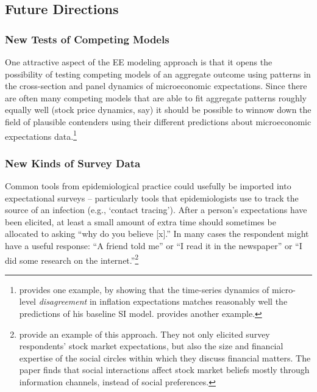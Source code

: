 \subsection{Future Directions}\label{subsec:future}\hypertarget{future}{}

\subsubsection{New Tests of Competing Models}
One attractive aspect of the EE modeling approach is that it opens the possibility of testing competing models of an aggregate outcome using patterns in the cross-section and panel dynamics of microeconomic expectations.  Since there are often many competing models that are able to fit aggregate patterns roughly equally well (stock price dynamics, say) it should be possible to winnow down the field of plausible contenders using their different predictions about microeconomic expectations data.\footnote{\cite{carroll2001epidemiology} provides one example, by showing that the time-series dynamics of micro-level \textit{disagreement} in inflation expectations matches reasonably well the predictions of his baseline SI model.  \cite{banerjee2013diffusion} provides another example.}

\subsubsection{New Kinds of Survey Data}
Common tools from epidemiological practice could usefully be imported into expectational surveys -- particularly tools that epidemiologists use to track the source of an infection (e.g., `contact tracing').  After a person's expectations have been elicited, at least a small amount of extra time should sometimes be allocated to asking ``why do you believe [x].''  In many cases the respondent might have a useful response: ``A friend told me'' or ``I read it in the newspaper'' or ``I did some research on the internet.''\footnote{\cite{arrondel2020informative} provide an example of this approach. They not only elicited survey respondents' stock market expectations, but also the size and financial expertise of the social circles within which they discuss financial matters. The paper finds that social interactions affect stock market beliefs mostly through information channels, instead of social  preferences.} %

